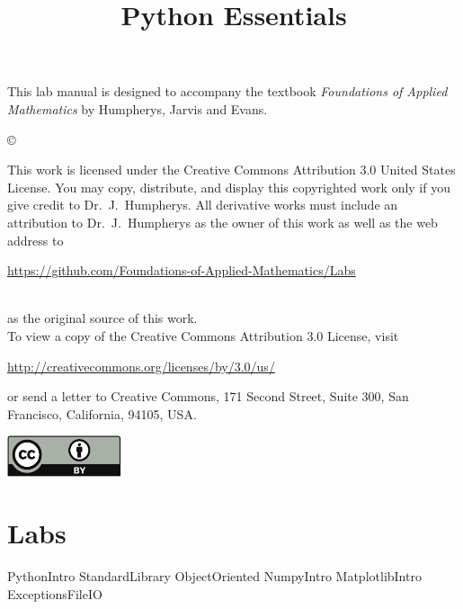 \documentclass[opener-c,labs,blue,nociteref]{HJnewsiambook}
\title{Python Essentials}
\begin{document}

\thispagestyle{empty} %
\maketitle
\thispagestyle{empty}
\frontmatter



\begin{thepreface} %

This lab manual is designed to accompany the textbook \emph{Foundations of Applied Mathematics} by Humpherys, Jarvis and Evans.

\vfill
\copyright{This work is licensed under the Creative Commons Attribution 3.0 United States
License.  You may copy, distribute, and display this copyrighted work only if you give
credit to Dr.~J.~Humpherys. All derivative works must include an attribution to Dr.~J.~Humpherys as the owner of this work as well as the web address to
\\\centerline{\url{https://github.com/Foundations-of-Applied-Mathematics/Labs}}\\as the original source of this work.
\\To view a copy of the Creative Commons Attribution 3.0 License, visit
\\\centerline{\url{http://creativecommons.org/licenses/by/3.0/us/}} or send a letter to Creative Commons, 171 Second Street, Suite 300, San Francisco, California, 94105, USA.}

\vfill
\centering\includegraphics[height=1.2cm]{by.pdf}
\vfill
\end{thepreface}

\setcounter{tocdepth}{1}
\tableofcontents

\mainmatter %

\part{Labs}
{PythonIntro}
{StandardLibrary}
{ObjectOriented}
{NumpyIntro}
{MatplotlibIntro}
{ExceptionsFileIO}
\end{document}
